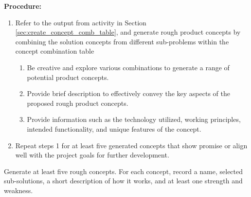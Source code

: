 \textbf{Procedure:}
\begin{enumerate}
    \item Refer to the output from activity in Section \ref{sec:create_concept_comb_table}, and generate rough product concepts by combining the solution concepts from different sub-problems within the concept combination table
    \begin{enumerate}
        \item Be creative and explore various combinations to generate a range of potential product concepts.
        \item Provide brief description to effectively convey the key aspects of the proposed rough product concepts.
        \item Provide information such as the technology utilized, working principles, intended functionality, and unique features of the concept.
    \end{enumerate}
    \item Repeat steps 1 for at least five generated concepts that show promise or align well with the project goals for further development.
\end{enumerate}

\begin{tcolorbox}[title=Checkpoint]
Generate at least five rough concepts. For each concept, record a name, selected sub-solutions, a short description of how it works, and at least one strength and weakness.
\end{tcolorbox}




